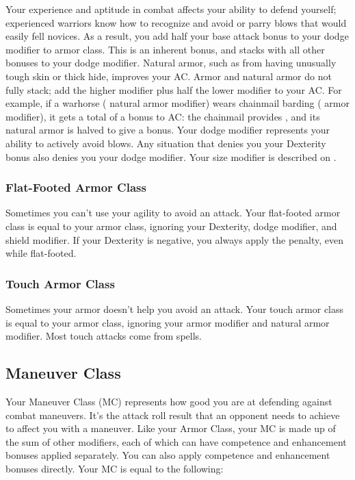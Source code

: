  Your experience and aptitude in combat affects your ability to defend yourself; experienced warriors know how to recognize and avoid or parry blows that would easily fell novices. As a result, you add half your base attack bonus to your dodge modifier to armor class. This is an inherent bonus, and stacks with all other bonuses to your dodge modifier.
 Natural armor, such as from having unusually tough skin or thick hide, improves your AC. Armor and natural armor do not fully stack; add the higher modifier plus half the lower modifier to your AC. For example, if a warhorse ( natural armor modifier) wears chainmail barding ( armor modifier), it gets a total of a  bonus to AC: the chainmail provides , and its natural armor is halved to give a  bonus.
 Your dodge modifier represents your ability to actively avoid blows. Any situation that denies you your Dexterity bonus also denies you your dodge modifier.
 Your size modifier is described on .

\subsubsection{Flat-Footed Armor Class}
Sometimes you can't use your agility to avoid an attack. Your flat-footed armor class is equal to your armor class, ignoring your Dexterity, dodge modifier, and shield modifier. If your Dexterity is negative, you always apply the penalty, even while flat-footed.

\subsubsection{Touch Armor Class}
Sometimes your armor doesn't help you avoid an attack. Your touch armor class is equal to your armor class, ignoring your armor modifier and natural armor modifier. Most touch attacks come from spells.

\subsection{Maneuver Class}
Your Maneuver Class (MC) represents how good you are at defending against combat maneuvers. It's the attack roll result that an opponent needs to achieve to affect you with a maneuver. Like your Armor Class, your MC is made up of the sum of other modifiers, each of which can have competence and enhancement bonuses applied separately. You can also apply competence and enhancement bonuses directly. Your MC is equal to the following:


